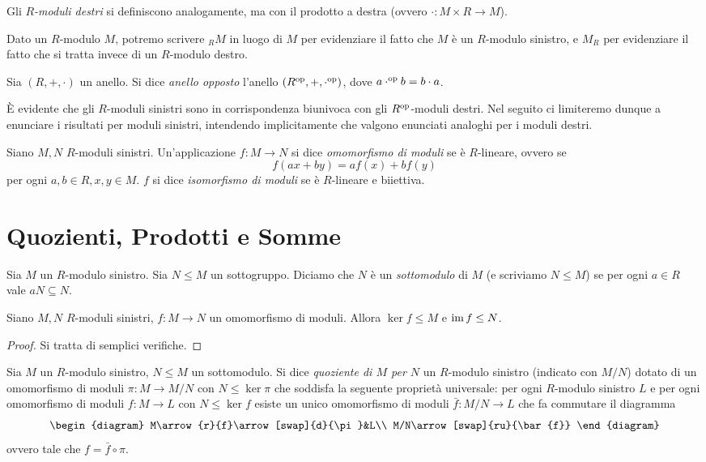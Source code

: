Gli \emph{$R$-moduli destri} si definiscono analogamente, ma con il prodotto a destra (ovvero $\cdot:M\times R\to M$).

Dato un $R$-modulo $M$, potremo scrivere $_RM$ in luogo di $M$ per evidenziare il fatto che $M$ è un $R$-modulo sinistro, e $M_R$ per evidenziare il fatto che si tratta invece di un $R$-modulo destro.

\begin{definition}
Sia $(R,+,\cdot)$ un anello. Si dice \emph{anello opposto} l'anello $(R^\text{op},+,\cdot^\text{op})$, dove $a\cdot^\text{op}b=b\cdot a$.
\end{definition}

È evidente che gli $R$-moduli sinistri sono in corrispondenza biunivoca con gli $R^\text{op}$-moduli destri. Nel seguito ci limiteremo dunque a enunciare i risultati per moduli sinistri, intendendo implicitamente che valgono enunciati analoghi per i moduli destri.

\begin{definition}
Siano $M,N$ $R$-moduli sinistri. Un'applicazione $f:M\to N$ si dice \emph{omomorfismo di moduli} se è $R$-lineare, ovvero se
$$
f(ax+by)=af(x)+bf(y)
$$
per ogni $a,b\in R\comma x,y\in M$. $f$ si dice \emph{isomorfismo di moduli} se è $R$-lineare e biiettiva.
\end{definition}

\section{Quozienti, Prodotti e Somme}

\begin{definition}
Sia $M$ un $R$-modulo sinistro. Sia $N\le M$ un sottogruppo. Diciamo che $N$ è un \emph{sottomodulo} di $M$ (e scriviamo $N\le M$) se per ogni $a\in R$ vale $aN\subseteq N$.
\end{definition}

\begin{proposition}
Siano $M,N$ $R$-moduli sinistri, $f:M\to N$ un omomorfismo di moduli. Allora $\ker f\le M$ e $\operatorname{im} f\le N$.
\end{proposition}
\begin{proof}
Si tratta di semplici verifiche.
\end{proof}

\begin{definition}
Sia $M$ un $R$-modulo sinistro, $N\le M$ un sottomodulo. Si dice \emph{quoziente di $M$ per $N$} un $R$-modulo sinistro (indicato con $M/N$) dotato di un omomorfismo di moduli $\pi:M\to M/N$ con $N\le\ker\pi$ che soddisfa la seguente proprietà universale: per ogni $R$-modulo sinistro $L$ e per ogni omomorfismo di moduli $f:M\to L$ con $N\le\ker f$ esiste un unico omomorfismo di moduli $\bar{f}:M/N\to L$ che fa commutare il diagramma
$$
\begin{diagram}
M\arrow{r}{f}\arrow[swap]{d}{\pi}&L\\
M/N\arrow[swap]{ru}{\bar{f}}
\end{diagram}
$$
ovvero tale che $f=\bar{f}\circ\pi$.
\end{definition}

